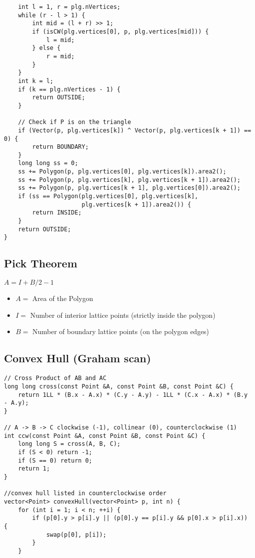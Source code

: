 \documentclass[11pt,a4paper]{article}
\begin{document}
\begin{multicols*}{2}
\begin{lstlisting}
    int l = 1, r = plg.nVertices;
    while (r - l > 1) {
        int mid = (l + r) >> 1;
        if (isCW(plg.vertices[0], p, plg.vertices[mid])) {
            l = mid;
        } else {
            r = mid;
        }
    }
    int k = l;
    if (k == plg.nVertices - 1) {
        return OUTSIDE;
    }

    // Check if P is on the triangle
    if (Vector(p, plg.vertices[k]) ^ Vector(p, plg.vertices[k + 1]) == 0) {
        return BOUNDARY;
    }
    long long ss = 0;
    ss += Polygon(p, plg.vertices[0], plg.vertices[k]).area2();
    ss += Polygon(p, plg.vertices[k], plg.vertices[k + 1]).area2();
    ss += Polygon(p, plg.vertices[k + 1], plg.vertices[0]).area2();
    if (ss == Polygon(plg.vertices[0], plg.vertices[k],
                      plg.vertices[k + 1]).area2()) {
        return INSIDE;
    }
    return OUTSIDE;
}
\end{lstlisting}

\subsection{Pick Theorem}
$A = I + B/2 - 1$
\begin{itemize}
    \item $A = $ Area of the Polygon
    \item $I = $ Number of interior lattice points (strictly inside the polygon)
    \item $B = $ Number of boundary lattice points (on the polygon edges) 
\end{itemize}

\subsection{Convex Hull (Graham scan)}
\begin{lstlisting}
// Cross Product of AB and AC
long long cross(const Point &A, const Point &B, const Point &C) {
    return 1LL * (B.x - A.x) * (C.y - A.y) - 1LL * (C.x - A.x) * (B.y - A.y);
}

// A -> B -> C clockwise (-1), collinear (0), counterclockwise (1)
int ccw(const Point &A, const Point &B, const Point &C) {
    long long S = cross(A, B, C);
    if (S < 0) return -1;
    if (S == 0) return 0;
    return 1;
}

//convex hull listed in counterclockwise order
vector<Point> convexHull(vector<Point> p, int n) {
    for (int i = 1; i < n; ++i) {
        if (p[0].y > p[i].y || (p[0].y == p[i].y && p[0].x > p[i].x)) {
            swap(p[0], p[i]);
        }
    }


\end{lstlisting}
\end{multicols*}
\end{document}
